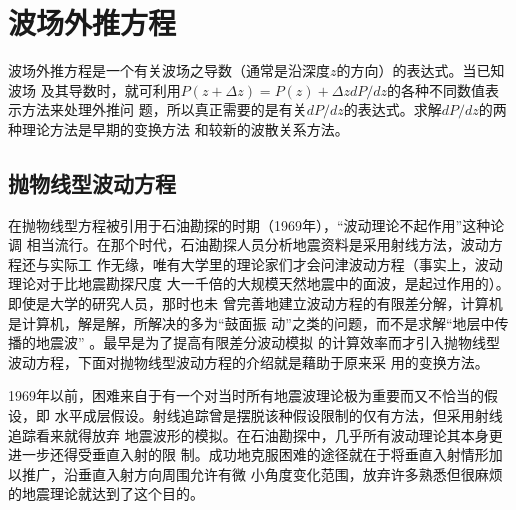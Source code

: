 \section{波场外推方程}
波场外推方程是一个有关波场之导数（通常是沿深度$z$的方向）的表达式。当已知波场
及其导数时，就可利用$P(z+\Delta z)=P(z)+\Delta zdP/dz$的各种不同数值表示方法来处理外推问
题，所以真正需要的是有关$dP/dz$的表达式。求解$dP/dz$的两种理论方法是早期的变换方法
和较新的波散关系方法。

\subsection{抛物线型波动方程}
在抛物线型方程被引用于石油勘探的时期（1969年），“波动理论不起作用”这种论调
相当流行。在那个时代，石油勘探人员分析地震资料是采用射线方法，波动方程还与实际工
作无缘，唯有大学里的理论家们才会问津波动方程（事实上，波动理论对于比地震勘探尺度
大一千倍的大规模天然地震中的面波，是起过作用的）。即使是大学的研究人员，那时也未
曾完善地建立波动方程的有限差分解，计算机是计算机，解是解，所解决的多为“鼓面振
动”之类的问题，而不是求解“地层中传播的地震波”
。最早是为了提高有限差分波动模拟
的计算效率而才引入抛物线型波动方程，下面对抛物线型波动方程的介绍就是藉助于原来采
用的变换方法。

1969年以前，困难来自于有一个对当时所有地震波理论极为重要而又不恰当的假设，即
水平成层假设。射线追踪曾是摆脱该种假设限制的仅有方法，但采用射线追踪看来就得放弃
地震波形的模拟。在石油勘探中，几乎所有波动理论其本身更进一步还得受垂直入射的限
制。成功地克服困难的途径就在于将垂直入射情形加以推广，沿垂直入射方向周围允许有微
小角度变化范围，放弃许多熟悉但很麻烦的地震理论就达到了这个目的。

